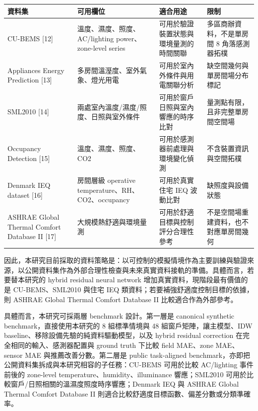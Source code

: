 \documentclass[12pt,a4paper]{article}
\begin{document}
\begin{table}[htbp]
\centering
\footnotesize
\renewcommand{\arraystretch}{1.25}
\begin{tabular}{|>{\raggedright\arraybackslash}p{}|>{\raggedright\arraybackslash}p{}|>{\raggedright\arraybackslash}p{}|>{\raggedright\arraybackslash}p{}|}
\hline
\textbf{資料集} & \textbf{可用欄位} & \textbf{適合用途} & \textbf{限制} \\
\hline
CU-BEMS [12] & 溫度、濕度、照度、AC/lighting power、zone-level series & 可用於驗證裝置狀態與環境量測的時間關聯 & 多區商辦資料，不是單房間 8 角落感測器拓樸 \\
\hline
Appliances Energy Prediction [13] & 多房間溫溼度、室外氣象、燈光用電 & 可用於室內外條件與用電關聯分析 & 缺空間幾何與單房間場分布標記 \\
\hline
SML2010 [14] & 兩處室內溫度/濕度/照度、日照與室外條件 & 可用於窗戶日照與室內響應的時序比對 & 量測點有限，且非完整單房間空間場 \\
\hline
Occupancy Detection [15] & 溫度、濕度、照度、CO2 & 可用於感測器前處理與環境變化偵測 & 不含裝置資訊與空間拓樸 \\
\hline
Denmark IEQ dataset [16] & 房間層級 operative temperature、RH、CO2、occupancy & 可用於真實住宅 IEQ 波動比對 & 缺照度與設備狀態 \\
\hline
ASHRAE Global Thermal Comfort Database II [17] & 大規模熱舒適與環境量測 & 可用於舒適目標與控制評分合理性參考 & 不是空間場重建資料，也不對應單房間幾何 \\
\hline
\end{tabular}
\end{table}

因此，本研究目前採取的資料策略是：以可控制的模擬情境作為主要訓練與驗證來源，以公開資料集作為外部合理性檢查與未來真實資料接軌的準備。具體而言，若要替本研究的 hybrid residual neural network 增加真實資料，現階段最有價值的是 CU-BEMS、SML2010 與住宅 IEQ 類資料；若要補強舒適度控制目標的依據，則 ASHRAE Global Thermal Comfort Database II 比較適合作為外部參考。


具體而言，本研究可採兩層 benchmark 設計。第一層是 canonical synthetic benchmark，直接使用本研究的 8 組標準情境與 48 組窗戶矩陣，讓主模型、IDW baseline、移除設備先驗的純資料驅動模型，以及 hybrid residual correction 在完全相同的輸入、感測器配置與 ground truth 下比較 field MAE、zone MAE、sensor MAE 與推薦改善分數。第二層是 public task-aligned benchmark，亦即把公開資料集拆成與本研究相容的子任務：CU-BEMS 可用於比較 AC/lighting 事件前後的 zone-level temperature、humidity、illuminance 響應；SML2010 可用於比較窗戶/日照相關的溫濕度照度時序響應；Denmark IEQ 與 ASHRAE Global Thermal Comfort Database II 則適合比較舒適度目標函數、偏差分數或分類準確率。
\end{document}
